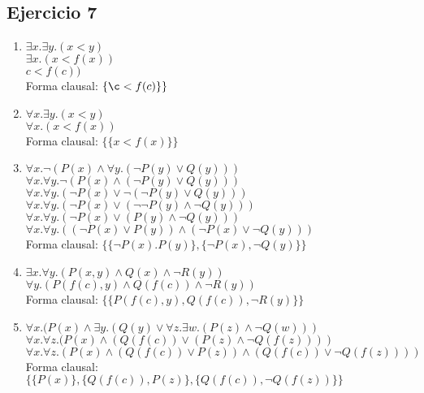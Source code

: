 \documentclass[10pt,a4paper]{article}
\begin{document}
\subsection{Ejercicio 7}
    \begin{enumerate}
        \item 
        $\exists x. \exists y. (x<y)$ \\
        $\exists x. (x<f(x))$ \\
        $c<f(c))$ \\
        Forma clausal: $\{\c<f(c)\}\}$
        \item 
        $\forall x. \exists y. (x<y)$ \\
        $\forall x. (x<f(x))$ \\
        Forma clausal: $\{\{x<f(x)\}\}$
        \item 
        $\forall x. \neg(P(x) \wedge \forall y.(\neg P(y) \vee Q(y)))$ \\
        $\forall x. \forall y. \neg(P(x) \wedge (\neg P(y) \vee Q(y)))$ \\
        $\forall x. \forall y. (\neg P(x) \vee \neg(\neg P(y) \vee Q(y)))$ \\
        $\forall x. \forall y. (\neg P(x) \vee (\neg \neg P(y) \wedge \neg Q(y)))$ \\
        $\forall x. \forall y. (\neg P(x) \vee (P(y) \wedge \neg Q(y)))$ \\
        $\forall x. \forall y. ( (\neg P(x) \vee P(y)) \wedge (\neg P(x) \vee \neg Q(y) ) )$ \\
        Forma clausal: $\{\{ \neg P(x). P(y)\},\{ \neg P(x), \neg Q(y)\}\}$
        \item 
        $\exists x. \forall y. (P(x,y) \wedge Q(x) \wedge \neg R(y))$ \\
        $\forall y. (P(f(c),y) \wedge Q(f(c)) \wedge \neg R(y))$ \\
        Forma clausal: $\{\{P(f(c),y), Q(f(c)), \neg R(y)\}\}$
        \item 
        $\forall x. (P(x) \wedge \exists y. (Q(y) \vee \forall z. \exists w. (P(z) \wedge \neg Q(w)))$ \\
        $\forall x. \forall z. (P(x) \wedge (Q(f(c)) \vee (P(z) \wedge \neg Q(f(z))))$ \\
        $\forall x. \forall z. (P(x) \wedge (Q(f(c)) \vee P(z) ) \wedge (Q(f(c)) \vee \neg Q(f(z)) ) )$ \\
        Forma clausal: $\{\{ P(x)\} , \{Q(f(c)), P(z)\} , \{Q(f(c)), \neg Q(f(z))\} \}$
    \end{enumerate}
\end{document}
